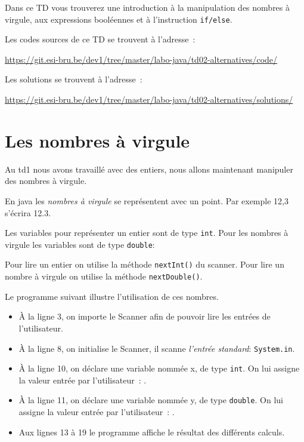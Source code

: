 \documentclass[a4paper,11pt]{article}
\date{2018 -- 2019}
\newcommand{\publicbasepath}{https://git.esi-bru.be/dev1/tree/master/labo-java/td02-alternatives}
\newcommand{\solutionspublicpath}{\publicbasepath/solutions/}
\renewcommand{\listingpublicpath}{\publicbasepath/code/}
\begin{document}
\entete
\titre
{}
\lastedit


	Dans ce TD vous trouverez une introduction à la manipulation des nombres à virgule,
	aux expressions booléennes et à l'instruction \texttt{if/else}.
	
	Les codes sources de ce TD se trouvent à l'adresse~: 
	
	\url{\listingpublicpath}
	
	Les solutions se trouvent à l'adresse~:
	
		\url{\solutionspublicpath}

	
	\tableofcontents

	\newpage

\section{Les nombres à virgule}


	Au td1 nous avons travaillé avec des entiers, nous allons maintenant 
	manipuler des nombres à virgule.

	En java les \emph{nombres à virgule} se représentent avec un point. 
	Par exemple 12,3 s'écrira 12.3.

	Les variables pour représenter un entier sont de type \texttt{int}.
	Pour les nombres à virgule les variables sont de type \texttt{double}:
	

	Pour lire un entier on utilise la méthode \texttt{nextInt()} du scanner.
	Pour lire un nombre à virgule on utilise la méthode \texttt{nextDouble()}.
	


	Le programme suivant illustre l'utilisation de ces nombres.

	\bigskip

	\begin{itemize}
		\item \`A la ligne 3, on importe le Scanner afin de pouvoir lire les entrées de l'utilisateur.
		\item \`A la ligne 8, on initialise le Scanner, il scanne \emph{l'entrée standard}: 
			\texttt{System.in}.

		\item \`A la ligne 10, on déclare une variable nommée x, de type \texttt{int}. 
			On lui assigne la valeur entrée par l'utilisateur~: .

		\item \`A la ligne 11, on déclare une variable nommée y, de type \texttt{double}.
			On lui assigne la valeur entrée par l'utilisateur~: .

		\item Aux lignes 13 à 19 le programme affiche le résultat des différents calculs.

	\end{itemize}
\end{document}
